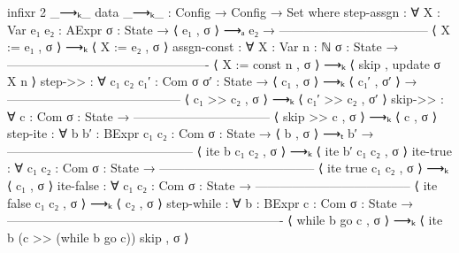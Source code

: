 \documentclass{lecturenotes}
\begin{document}
\begin{code}
infixr 2 _⟶ₖ_
data _⟶ₖ_ : Config → Config → Set where
  step-assgn : ∀ {X : Var} {e₁ e₂ : AExpr} {σ : State} →
          ⟨ e₁ , σ ⟩ ⟶ₐ e₂ →
    ------------------------------------
     ⟨ X := e₁ , σ ⟩ ⟶ₖ ⟨ X := e₂ , σ ⟩
  assgn-const : ∀ {X : Var} {n : ℕ} {σ : State} →
    -------------------------------------------------
     ⟨ X := const n , σ ⟩ ⟶ₖ ⟨ skip , update σ X n ⟩
  step->> : ∀ {c₁ c₂ c₁′ : Com} {σ σ′ : State} →
            ⟨ c₁ , σ ⟩ ⟶ₖ ⟨ c₁′ , σ′ ⟩ →
    ------------------------------------------
     ⟨ c₁ >> c₂ , σ ⟩ ⟶ₖ ⟨ c₁′ >> c₂ , σ′ ⟩
  skip->> : ∀ {c : Com} {σ : State} →
    ---------------------------------
     ⟨ skip >> c , σ ⟩ ⟶ₖ ⟨ c , σ ⟩
  step-ite : ∀ {b b′ : BExpr} {c₁ c₂ : Com} {σ : State} →
               ⟨ b , σ ⟩ ⟶ₜ b′ →
    ---------------------------------------------
     ⟨ ite b c₁ c₂ , σ ⟩ ⟶ₖ ⟨ ite b′ c₁ c₂ , σ ⟩ 
  ite-true : ∀ {c₁ c₂ : Com} {σ : State} →
    --------------------------------------
     ⟨ ite true c₁ c₂ , σ ⟩ ⟶ₖ ⟨ c₁ , σ ⟩
  ite-false : ∀ {c₁ c₂ : Com} {σ : State} →
    --------------------------------------
     ⟨ ite false c₁ c₂ , σ ⟩ ⟶ₖ ⟨ c₂ , σ ⟩
  step-while : ∀ {b : BExpr} {c : Com} {σ : State} →
    -------------------------------------------------------------------
     ⟨ while b go c , σ ⟩ ⟶ₖ ⟨ ite b (c >> (while b go c)) skip , σ ⟩ 
\end{code}
\end{document}
